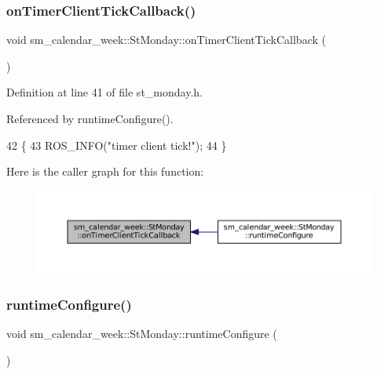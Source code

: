 \subsubsection{\texorpdfstring{on\+Timer\+Client\+Tick\+Callback()}{onTimerClientTickCallback()}}
{\footnotesize\ttfamily void sm\+\_\+calendar\+\_\+week\+::\+St\+Monday\+::on\+Timer\+Client\+Tick\+Callback (\begin{DoxyParamCaption}{ }\end{DoxyParamCaption})\hspace{0.3cm}{\ttfamily [inline]}}



Definition at line 41 of file st\+\_\+monday.\+h.



Referenced by runtime\+Configure().


\begin{DoxyCode}
42     \{
43         ROS\_INFO(\textcolor{stringliteral}{"timer client tick!"});
44     \}
\end{DoxyCode}
Here is the caller graph for this function\+:
\nopagebreak
\begin{figure}[H]
\begin{center}
\leavevmode
\includegraphics[width=350pt]{structsm__calendar__week_1_1StMonday_a7d1e6fe61b8618791254704a41cc1833_icgraph}
\end{center}
\end{figure}
\mbox{\label{structsm__calendar__week_1_1StMonday_aed3cf2a8d76902e9f35d66e99de0a1f9}} 
\subsubsection{\texorpdfstring{runtime\+Configure()}{runtimeConfigure()}}
{\footnotesize\ttfamily void sm\+\_\+calendar\+\_\+week\+::\+St\+Monday\+::runtime\+Configure (\begin{DoxyParamCaption}{ }\end{DoxyParamCaption})\hspace{0.3cm}{\ttfamily [inline]}}




